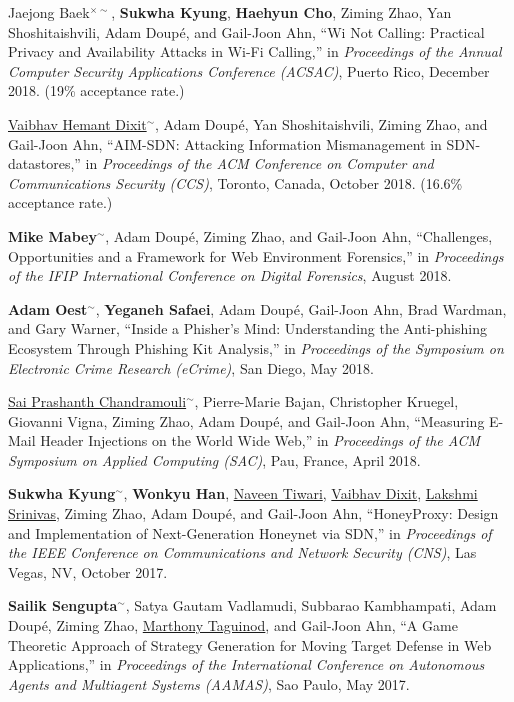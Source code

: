 \documentclass[11pt,letterpaper,sans]{moderncv}
\begin{document}
\begin{etaremune}
\item Jaejong Baek$^{\times\sim}$, \textbf{Sukwha Kyung}, \textbf{Haehyun Cho}, Ziming Zhao, Yan Shoshitaishvili, Adam Doup\'e, and Gail-Joon Ahn, ``Wi Not Calling: Practical Privacy and Availability Attacks in Wi-Fi Calling,'' in \emph{Proceedings of the Annual Computer Security Applications Conference (ACSAC)}, Puerto Rico, December 2018. (19\% acceptance rate.)

\item \underline{Vaibhav Hemant Dixit}$^{\sim}$, Adam Doup\'e, Yan
  Shoshitaishvili, Ziming Zhao, and Gail-Joon Ahn, ``AIM-SDN:
  Attacking Information Mismanagement in SDN-datastores,'' in
  \emph{Proceedings of the ACM Conference on Computer and
    Communications Security (CCS)}, Toronto, Canada, October 2018. (16.6\% acceptance rate.)

\item \textbf{Mike Mabey}$^{\sim}$, Adam Doup\'e, Ziming Zhao, and Gail-Joon Ahn, ``Challenges, Opportunities and a Framework for Web Environment Forensics,'' in \emph{Proceedings of the IFIP International Conference on Digital Forensics}, August 2018.
  
\item \textbf{Adam Oest}$^{\sim}$, \textbf{Yeganeh Safaei}, Adam Doup\'e,
  Gail-Joon Ahn, Brad Wardman, and Gary Warner, ``Inside a Phisher's
  Mind: Understanding the Anti-phishing Ecosystem Through Phishing Kit
  Analysis,'' in \emph{Proceedings of the Symposium on Electronic
    Crime Research (eCrime)}, San Diego, May 2018. 
  
\item \underline{Sai Prashanth Chandramouli}$^{\sim}$, Pierre-Marie Bajan,
  Christopher Kruegel, Giovanni Vigna, Ziming Zhao, Adam Doup\'e, and
  Gail-Joon Ahn, ``Measuring E-Mail Header Injections on the World
  Wide Web,'' in \emph{Proceedings of the ACM Symposium on Applied
    Computing (SAC)}, Pau, France, April 2018.

\item \textbf{Sukwha Kyung}$^{\sim}$, \textbf{Wonkyu Han},
  \underline{Naveen Tiwari}, \underline{Vaibhav Dixit},
  \underline{Lakshmi Srinivas}, Ziming Zhao, Adam Doup\'e, and
  Gail-Joon Ahn, ``HoneyProxy: Design and Implementation of
  Next-Generation Honeynet via SDN,'' in \emph{Proceedings of the IEEE
    Conference on Communications and Network Security (CNS)}, Las
  Vegas, NV, October 2017. 

\item \textbf{Sailik Sengupta}$^{\sim}$, Satya Gautam Vadlamudi, Subbarao Kambhampati,
  Adam Doup\'e, Ziming Zhao, \underline{Marthony Taguinod},
  and Gail-Joon Ahn, ``A Game Theoretic Approach of Strategy
  Generation for Moving Target Defense in Web Applications,'' in
  \emph{Proceedings of the International Conference on Autonomous Agents
    and Multiagent Systems (AAMAS)}, Sao Paulo, May 2017.


\end{etaremune}
\end{document}
